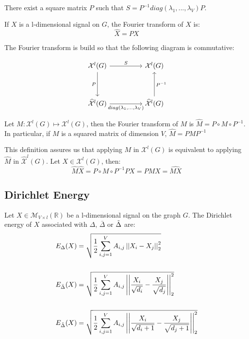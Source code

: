 \documentclass[12pt]{article}
\begin{document}
There exist a square matrix $P$ such that  $S = P^{-1} diag(\lambda_1,..., \lambda_V) P $.

\begin{definition}
    If $X$ is a l-dimensional signal on $G$, the Fourier transform of $X$ is:
    $$
    \widehat{X} = P X
    $$
\end{definition}

The Fourier transform is build so that the following diagram is commutative:

\[ \begin{tikzcd}[row sep=huge, column sep=huge]
\mathcal{X}^l(G) \arrow{r}{S} \arrow[swap]{d}{P} & \mathcal{X}^l(G) \\%
\widehat{\mathcal{X}}^l(G) \arrow[swap]{r}{diag(\lambda_1,...,\lambda_V)}& \widehat{\mathcal{X}}^l(G) \arrow[swap]{u}{P^{-1}}
\end{tikzcd}
\]

\begin{definition}
    Let $M: \mathcal{X}^l(G) \mapsto \mathcal{X}^l(G)$, then the Fourier transform of $M$ is $\widehat{M} = P\circ M \circ P^{-1}$. In particular, if $M$ is a squared matrix of dimension $V$, $\widehat{M} = P M P^{-1}$
\end{definition}

This definition assures us that applying $M$ in $\mathcal{X}^l(G)$ is equivalent to applying $\widehat{M}$ in $\widehat{\mathcal{X}}^l(G)$. Let $X \in \mathcal{X}^l(G)$, then:
$$
\widehat{M}\widehat{X} = P\circ M \circ P^{-1} P X = P M X = \widehat{MX}
$$

\subsection{Dirichlet Energy}

\begin{definition}
    Let $X \in \mathcal{M}_{V \times l}(\mathbb{R})$ be a l-dimensional signal on the graph $G$. The Dirichlet energy of $X$ associated with $\Delta$, $\bar{\Delta}$ or $\Tilde{\Delta}$ are:
    \begin{align*}
    E_{\Delta}(X) &= \sqrt{\frac{1}{2} \sum_{i,j = 1}^V A_{i,j} \left|\left|X_i -X_j\right|\right|_2^2 }\\\\
     E_{\bar{\Delta}}(X) &= \sqrt{\frac{1}{2} \sum_{i,j = 1}^V A_{i,j} \left|\left|\frac{X_i}{\sqrt{d_i}} -\frac{X_j}{\sqrt{d_j}}\right|\right|_2^2 }\\\\
        E_{\Tilde{\Delta}}(X) &= \sqrt{\frac{1}{2} \sum_{i,j = 1}^V A_{i,j} \left|\left|\frac{X_i}{\sqrt{d_i+1}} -\frac{X_j}{\sqrt{d_j+1}}\right|\right|_2^2 }
    \end{align*}
\end{definition}
\end{document}

